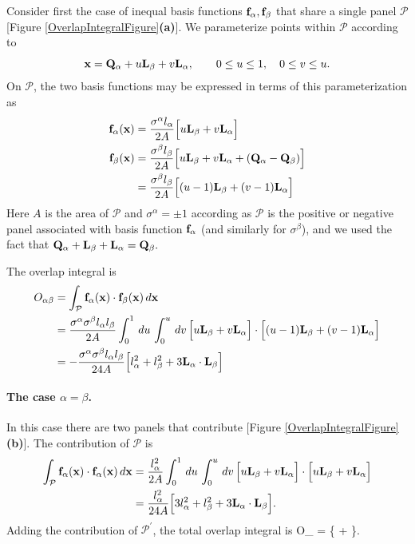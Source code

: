 \documentclass[letterpaper]{article}
\begin{document}
Consider first the case of inequal basis functions
$\mathbf{f}_\alpha,\mathbf{f}_\beta$ that share a single
panel $\mathcal{P}$ [Figure \ref{OverlapIntegralFigure}\textbf{(a)}].
We parameterize points within $\mathcal{P}$ 
according to 
$$ \mathbf{x}=\mathbf{Q}_\alpha + u\mathbf{L}_\beta + v\mathbf{L}_\alpha, 
   \qquad 0\le u \le 1, \quad 0 \le v \le u.
$$
On $\mathcal{P}$, the two basis functions may be expressed in 
terms of this parameterization as 
\begin{align*} 
 \mathbf{f}_\alpha(\mathbf{x}) 
&= 
 \frac{\sigma^\alpha l_\alpha}{2A}
 \Big[u\mathbf{L}_\beta + v\mathbf{L}_\alpha\Big] 
\\
 \mathbf{f}_\beta(\mathbf{x}) 
&= \frac{\sigma^\beta l_\beta}{2A}
  \Big[ u\mathbf{L}_\beta + v\mathbf{L}_\alpha + (\mathbf{Q}_\alpha - \mathbf{Q}_\beta)\Big]
\\
&= \frac{\sigma^\beta l_\beta}{2A}
  \Big[ (u-1)\mathbf{L}_\beta + (v-1)\mathbf{L}_\alpha\Big]
\end{align*} 
Here $A$ is the area of $\mathcal{P}$ and $\sigma^\alpha = \pm 1$  
according as $\mathcal{P}$ is the positive or negative panel
associated with basis function $\mathbf{f}_\alpha$ (and similarly 
for $\sigma^{\beta}$), and we used the fact that 
$\mathbf{Q}_\alpha + \mathbf{L}_\beta + \mathbf{L}_\alpha = \mathbf{Q}_\beta.$

The overlap integral is 
\begin{align}
O_{\alpha\beta}
&=\int_{\mathcal{P}} \mathbf{f}_\alpha(\mathbf{x}) \cdot \mathbf{f}_\beta(\mathbf{x})  \, d\mathbf{x} 
\nonumber \\
&=\frac{\sigma^\alpha \sigma^\beta l_\alpha l_\beta}{2A} 
  \int_0^1 \, du \, \int_0^u \, dv \, 
  \Big[ u \mathbf{L}_\beta + v\mathbf{L}_\alpha\Big]
 \cdot
  \Big[ (u-1) \mathbf{L}_\beta + (v-1)\mathbf{L}_\alpha\Big]
\nonumber \\
&=-\frac{\sigma^\alpha \sigma^\beta l_\alpha l_\beta}{24A} 
  \Big[ l_\alpha^2 + l_\beta^2 + 3\mathbf{L}_\alpha\cdot \mathbf{L}_\beta\Big]
\label{OAlphaBeta}
\end{align}

\paragraph{The case $\alpha=\beta$.}

In this case there are two panels that contribute
[Figure \ref{OverlapIntegralFigure}\textbf{(b)}].
The contribution of $\mathcal{P}$ is
\begin{align*}
\int_{\mathcal{P}} \mathbf{f}_\alpha(\mathbf{x}) \cdot \mathbf{f}_\alpha(\mathbf{x})  \, d\mathbf{x} 
&=\frac{l_\alpha^2}{2A} 
  \int_0^1 \, du \, \int_0^u \, dv \, 
  \Big[ u \mathbf{L}_\beta + v\mathbf{L}_\alpha\Big]
 \cdot
  \Big[ u \mathbf{L}_\beta + v\mathbf{L}_\alpha\Big]
\\
&=\frac{l^2_\alpha}{24A} 
  \Big[ 3l_\alpha^2 + l_\beta^2 + 3\mathbf{L}_\alpha\cdot \mathbf{L}_\beta\Big].
\end{align*}
Adding the contribution of $\mathcal{P}^\prime$, 
the total overlap integral is 
{
O_{\alpha\alpha}
=
 \bigg\{ 
           
 +  
 \bigg\}.
}
\end{document}
